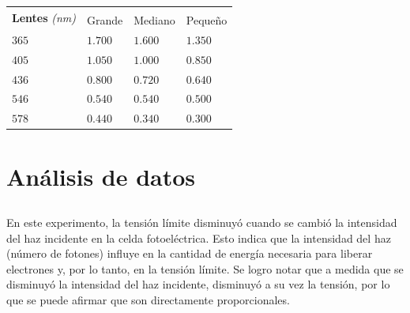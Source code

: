 \documentclass[letterpaper, 12pt]{article}
\begin{document}
\begin{table}[H]
      \begin{center}
            \begin{tabularx}{.9\linewidth}{|X|>{\centering\arraybackslash}X|>{\centering\arraybackslash}X|>{\centering\arraybackslash}X|}
                  \hline
                  \multicolumn{1}{|c|}{\multirow{2}{*}{\textbf{Lentes} \textit{(nm)}}} & \multicolumn{3}{c|}{\textbf{V}}                     \\
                  \cline{2-4}
                                                                                       & Grande                          & Mediano & Pequeño \\\hline
                  $365$                                                                & $1.700$                         & $1.600$ & $1.350$ \\\hline
                  $405$                                                                & $1.050$                         & $1.000$ & $0.850$ \\\hline
                  $436$                                                                & $0.800$                         & $0.720$ & $0.640$ \\\hline
                  $546$                                                                & $0.540$                         & $0.540$ & $0.500$ \\\hline
                  $578$                                                                & $0.440$                         & $0.340$ & $0.300$ \\\hline

            \end{tabularx}
      \end{center}
\end{table}

\section{Análisis de datos}

\subsection{}

En este experimento, la tensión límite disminuyó cuando se
cambió la intensidad del haz incidente en la celda
fotoeléctrica. Esto indica que la intensidad del haz
(número de fotones) influye en la cantidad de energía
necesaria para liberar electrones y, por lo tanto, en la
tensión límite. Se logro notar que a medida que se
disminuyó la intensidad del haz incidente, disminuyó a su
vez la tensión, por lo que se puede afirmar que son
directamente proporcionales.
\end{document}
